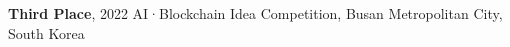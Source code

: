 




\begin{cvparagraph}

  \textbf{Third Place}, 2022 AI·Blockchain Idea Competition, Busan Metropolitan City, South Korea
\end{cvparagraph}
